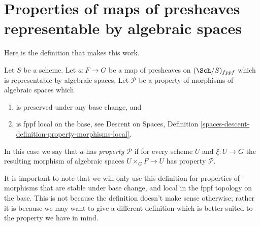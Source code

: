 \section{Properties of maps of presheaves representable by algebraic spaces}
\label{section-representable-by-spaces-properties}

\noindent
Here is the definition that makes this work.

\begin{definition}
\label{definition-property-transformation}
Let $S$ be a scheme. Let $a : F \to G$ be a map of presheaves on
$(\Sch/S)_{fppf}$ which is representable by algebraic spaces.
Let $\mathcal{P}$ be a property of morphisms of algebraic spaces which
\begin{enumerate}
\item is preserved under any base change, and
\item is fppf local on the base, see
Descent on Spaces,
Definition \ref{spaces-descent-definition-property-morphisms-local}.
\end{enumerate}
In this case we say that $a$ has {\it property $\mathcal{P}$} if for every
scheme $U$ and $\xi : U \to G$ the resulting morphism of algebraic spaces
$U \times_G F \to U$ has property $\mathcal{P}$.
\end{definition}

\noindent
It is important to note that we will only use this definition for
properties of morphisms that are stable under base change, and
local in the fppf topology on the base. This is
not because the definition doesn't make sense otherwise; rather it
is because we may want to give a different definition which is
better suited to the property we have in mind.

